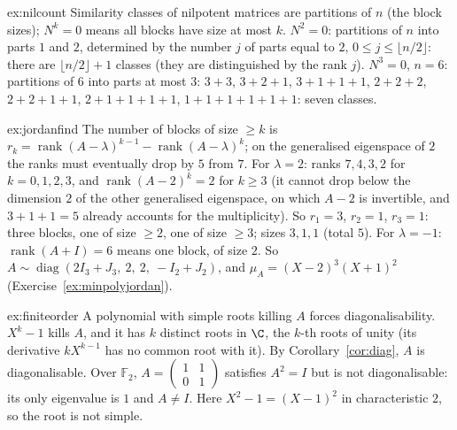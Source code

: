 \begin{solution}{ex:nilcount}
\idea Similarity classes of nilpotent matrices are partitions of $n$ (the block sizes); $N^k=0$ means all blocks have size
at most $k$.
\writeup $N^2=0$: partitions of $n$ into parts $1$ and $2$, determined by the number $j$ of parts equal to $2$,
$0\le j\le\lfloor n/2\rfloor$: there are $\lfloor n/2\rfloor+1$ classes (they are distinguished by the rank $j$). $N^3=0$, $n=6$:
partitions of $6$ into parts at most $3$: $3{+}3$, $3{+}2{+}1$, $3{+}1{+}1{+}1$, $2{+}2{+}2$, $2{+}2{+}1{+}1$,
$2{+}1{+}1{+}1{+}1$, $1{+}1{+}1{+}1{+}1{+}1$: seven classes.
\end{solution}

\begin{solution}{ex:jordanfind}
\idea The number of blocks of size $\ge k$ is $r_k=\operatorname{rank}(A-\lambda)^{k-1}-\operatorname{rank}(A-\lambda)^k$; on the
generalised eigenspace of $2$ the ranks must eventually drop by $5$ from $7$.
\writeup For $\lambda=2$: ranks $7,4,3,2$ for $k=0,1,2,3$, and $\operatorname{rank}(A-2)^k=2$ for $k\ge3$ (it cannot drop
below the dimension $2$ of the other generalised eigenspace, on which $A-2$ is invertible, and $3+1+1=5$ already accounts
for the multiplicity). So $r_1=3$, $r_2=1$, $r_3=1$: three blocks, one of size $\ge2$, one of size $\ge3$; sizes $3,1,1$
(total $5$). For $\lambda=-1$: $\operatorname{rank}(A+I)=6$ means one block, of size $2$. So
$A\sim\operatorname{diag}(2I_3+J_3,\ 2,\ 2,\ -I_2+J_2)$, and $\mu_A=(X-2)^3(X+1)^2$ (Exercise~\ref{ex:minpolyjordan}).
\end{solution}

\begin{solution}{ex:finiteorder}
\idea A polynomial with simple roots killing $A$ forces diagonalisability.
\writeup $X^k-1$ kills $A$, and it has $k$ distinct roots in $\C$, the $k$-th roots of unity (its derivative $kX^{k-1}$ has
no common root with it). By Corollary~\ref{cor:diag}, $A$ is diagonalisable. Over $\mathbb F_2$,
$A=\begin{pmatrix}1&1\\0&1\end{pmatrix}$ satisfies $A^2=I$ but is not diagonalisable: its only eigenvalue is $1$ and $A\ne I$. Here
$X^2-1=(X-1)^2$ in characteristic $2$, so the root is not simple.
\end{solution}

